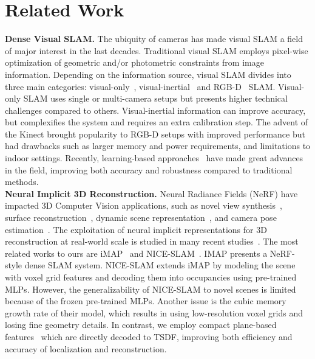 \section{Related Work}

\noindent \textbf{Dense Visual SLAM.} The ubiquity of cameras has made visual SLAM a field of major interest in the last decades. Traditional visual SLAM employs pixel-wise optimization of geometric and/or photometric constraints from image information. Depending on the information source, visual SLAM divides into three main categories: visual-only~\citep{newcombe2011dtam, engel2014lsd, forster2014svo, mur2017orb, Tateno_2017_CVPR, engel2017direct}, visual-inertial~\citep{mourikis2007multi, leutenegger2015keyframe, bloesch2015robust, mur2017visual, qin2018vins, von2018direct} and RGB-D~\citep{newcombe2011kinectfusion, kerl2013dense, endres20133, campos2021orb} SLAM. Visual-only SLAM uses single or multi-camera setups but presents higher technical challenges compared to others. Visual-inertial information can improve accuracy, but complexifies the system and requires an extra calibration step. The advent of the Kinect brought popularity to RGB-D setups with improved performance but had drawbacks such as larger memory and power requirements, and limitations to indoor settings. Recently, learning-based approaches~\citep{bloesch2018codeslam, li2018undeepvo, li2020deepslam, czarnowski2020deepfactors, teed2021droid} have made great advances in the field, improving both accuracy and robustness compared to traditional methods. \\

\noindent\textbf{Neural Implicit 3D Reconstruction.}  Neural Radiance Fields (NeRF) have impacted 3D Computer Vision applications, such as novel view synthesis~\citep{mildenhall2020nerf, martin2021nerf, verbin2022ref, mildenhall2022nerf}, surface reconstruction~\citep{park2019deepsdf, yariv2021volume, oechsle2021unisurf, wang2021neus, zhang2021ners, wang2022neuris, yariv2020multiview}, dynamic scene representation~\citep{gao2021dynamic, park2021nerfies, pumarola2021d, park2021hypernerf}, and camera pose estimation~\citep{yen2021inerf, wang2021nerf, lin2021barf, jeong2021self, xia2022sinerf}. The exploitation of neural implicit representations for 3D reconstruction at real-world scale is studied in many recent studies~\citep{azinovic2022neural, wang2022go, bozic2021transformerfusion, choe2021volumefusion, murez2020atlas, sun2021neuralrecon, weder2021neuralfusion, yan2021continual, li2022bnv}. The most related works to ours are iMAP~\citep{sucar2021imap} and NICE-SLAM~\citep{zhu2022nice}. IMAP presents a NeRF-style dense SLAM system. NICE-SLAM extends iMAP by modeling the scene with voxel grid features and decoding them into occupancies using pre-trained MLPs. However, the generalizability of NICE-SLAM to novel scenes is limited because of the frozen pre-trained MLPs. Another issue is the cubic memory growth rate of their model, which results in using low-resolution voxel grids and losing fine geometry details. In contrast, we employ compact plane-based features~\citep{chan2022efficient} which are directly decoded to TSDF, improving both efficiency and accuracy of localization and reconstruction.


